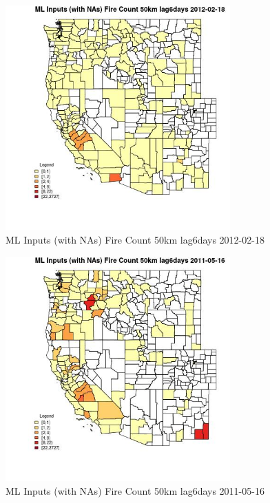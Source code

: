 \begin{figure} 
\centering  
\includegraphics[width=0.77\textwidth]{Code_Outputs/Report_ML_input_PM25_Step4_part_f_de_duplicated_aveswNAs_CountyFire_Count_50km_lag6daysMean2012-02-18.jpg} 
\caption{\label{fig:Report_ML_input_PM25_Step4_part_f_de_duplicated_aveswNAsCountyFire_Count_50km_lag6daysMean2012-02-18}ML Inputs (with NAs) Fire Count 50km lag6days 2012-02-18} 
\end{figure} 
 

\begin{figure} 
\centering  
\includegraphics[width=0.77\textwidth]{Code_Outputs/Report_ML_input_PM25_Step4_part_f_de_duplicated_aveswNAs_CountyFire_Count_50km_lag6daysMean2011-05-16.jpg} 
\caption{\label{fig:Report_ML_input_PM25_Step4_part_f_de_duplicated_aveswNAsCountyFire_Count_50km_lag6daysMean2011-05-16}ML Inputs (with NAs) Fire Count 50km lag6days 2011-05-16} 
\end{figure} 
 

